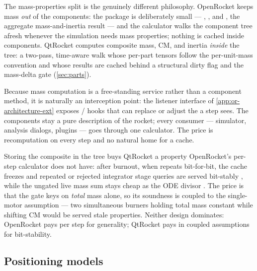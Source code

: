 The mass-properties split is the genuinely different philosophy. OpenRocket keeps mass
\emph{out} of the components: the  package is deliberately small ---
, , and , the aggregate
mass-and-inertia result --- and the calculator walks the component tree afresh whenever the
simulation needs mass properties; nothing is cached inside components. QtRocket computes
composite mass, CM, and inertia \emph{inside} the tree: a two-pass, time-aware walk
 whose per-part tensors follow the per-unit-mass convention
 and whose results are cached behind a structural dirty flag and
the mass-delta gate  (\cref{sec:parts}).

\begin{designrule}
Because mass computation is a free-standing service rather than a component method, it is
naturally an interception point: the listener interface of
\cref{app:or-architecture-ext} exposes /
hooks that can replace or adjust the  a step sees. The components stay a
pure description of the rocket; every consumer --- simulator, analysis dialogs, plugins ---
goes through one calculator. The price is recomputation on every step and no natural home
for a cache.
\end{designrule}

\begin{keyinsight}
Storing the composite in the tree buys QtRocket a property OpenRocket's per-step calculator
does not have: after burnout, when  repeats bit-for-bit, the cache freezes
and repeated or rejected integrator stage queries are served bit-stably
, while the ungated live mass sum stays cheap as the ODE
divisor . The price is that the gate keys on \emph{total}
mass alone, so its soundness is coupled to the single-motor assumption
 --- two simultaneous burners holding total mass constant
while shifting CM would be served stale properties. Neither design dominates: OpenRocket
pays per step for generality; QtRocket pays in coupled assumptions for bit-stability.
\end{keyinsight}

\subsection{Positioning models}\label{app:or-architecture-pos}

